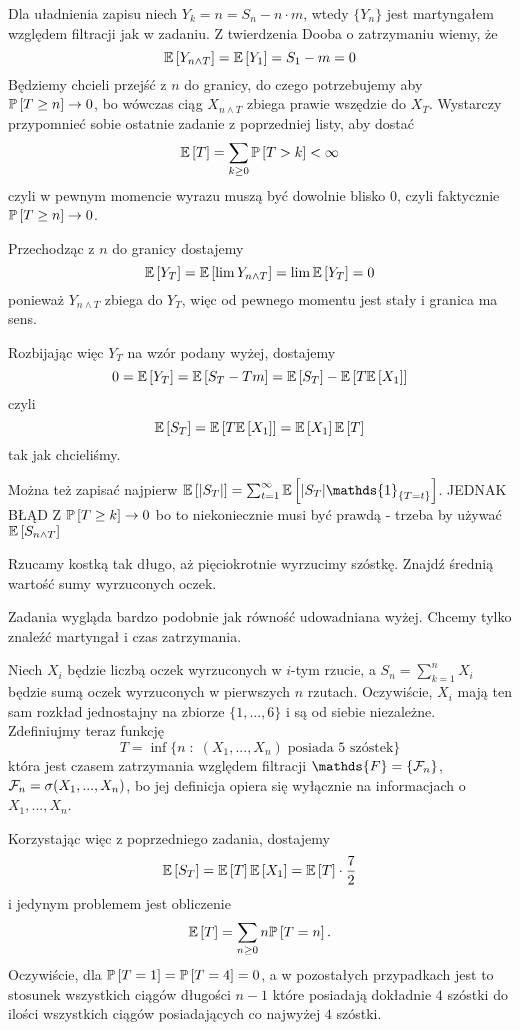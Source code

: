 \begin{solution}
  Dla uładnienia zapisu niech $Y_k=n=S_n-n\cdot m$, wtedy $\{Y_n\}$ jest martyngałem względem filtracji jak w zadaniu. 
  Z twierdzenia Dooba o zatrzymaniu wiemy, że
  $$\expected{Y_{n\land T}}=\expected{Y_1}=S_1-m=0$$
  Będziemy chcieli przejść z $n$ do granicy, do czego potrzebujemy aby $\prob{T\geq n}\to 0$, bo wówczas ciąg $X_{n\land T}$ zbiega prawie wszędzie do $X_T$. Wystarczy przypomnieć sobie ostatnie zadanie z poprzedniej listy, aby dostać
  $$\expected{T}=\sum_{k\geq 0}\prob{T>k}<\infty$$
  czyli w pewnym momencie wyrazu muszą być dowolnie blisko $0$, czyli faktycznie $\prob{T\geq n}\to 0$.

  Przechodząc z $n$ do granicy dostajemy
  $$\expected{Y_T}=\expected{\lim Y_{n\land T}}=\lim\expected{Y_T}=0$$
  ponieważ $Y_{n\land T}$ zbiega do $Y_T$, więc od pewnego momentu jest stały i granica ma sens.

  Rozbijając więc $Y_T$ na wzór podany wyżej, dostajemy
  $$0=\expected{Y_T}=\expected{S_T-Tm}=\expected{S_T}-\expected{T\expected{X_1}}$$
  czyli
  $$\expected{S_T}=\expected{T\expected{X_1}}=\expected{X_1}\expected{T}$$
  tak jak chcieliśmy.

  {\large\color{red}Można też zapisać najpierw $\expected{|S_T|}=\sum_{t=1}^\infty\expected{|S_T|\mathds{1}_{\{T=t\}}}$. JEDNAK BŁĄD Z $\prob{T\geq k}\to 0$ bo to niekoniecznie musi być prawdą - trzeba by używać $\expected{S_{n\land T}}$} 
\end{solution}

\begin{problem}
  Rzucamy kostką tak długo, aż pięciokrotnie wyrzucimy szóstkę. Znajdź średnią wartość sumy wyrzuconych oczek.
\end{problem}

\begin{solution}
  Zadania wygląda bardzo podobnie jak równość udowadniana wyżej. Chcemy tylko znaleźć martyngał i czas zatrzymania.

  Niech $X_i$ będzie liczbą oczek wyrzuconych w $i$-tym rzucie, a $S_n=\sum_{k=1}^nX_i$ będzie sumą oczek wyrzuconych w pierwszych $n$ rzutach. Oczywiście, $X_i$ mają ten sam rozkład jednostajny na zbiorze $\{1,...,6\}$ i są od siebie niezależne. Zdefiniujmy teraz funkcję
  $$T=\inf \{n\;:\;(X_1,...,X_n)\;\text{posiada 5 szóstek}\}$$
  która jest czasem zatrzymania względem filtracji $\mathds{F}=\{\set{F}_n\}$, $\mathcal{F}_n=\sigma(X_1,...,X_n)$, bo jej definicja opiera się wyłącznie na informacjach o $X_1,...,X_n$.

  Korzystając więc z poprzedniego zadania, dostajemy
  $$\expected{S_T}=\expected{T}\expected{X_1}=\expected{T}\cdot\frac{7}{2}$$
  i jedynym problemem jest obliczenie 
  $$\expected{T}=\sum_{n\geq0}n\prob{T=n}.$$
  Oczywiście, dla $\prob{T=1}=\prob{T=4}=0$, a w pozostałych przypadkach jest to stosunek wszystkich ciągów długości $n-1$ które posiadają dokładnie $4$ szóstki do ilości wszystkich ciągów posiadających co najwyżej $4$ szóstki.
\end{solution}

